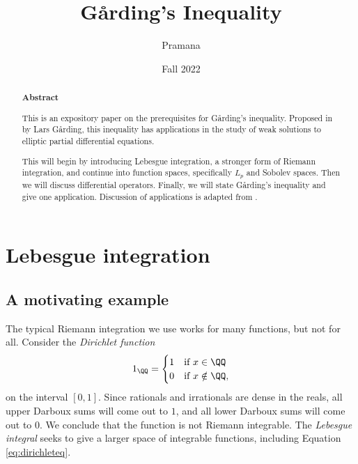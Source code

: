 \documentclass{scrartcl}
\title{G\r{a}rding's Inequality}
\author{Pramana}
\date{Fall 2022}
\begin{document}

\maketitle

\begin{abstract}
    \begin{center}
        \textbf{Abstract}
    \end{center}
    This is an expository paper on the prerequisites for 
    G\r{a}rding's inequality. Proposed in \cite{original-garding} by Lars G\r{a}rding, this inequality has applications in the study of weak solutions to elliptic partial differential equations. 
    
    This will begin by introducing Lebesgue integration, a stronger form 
    of Riemann integration, and continue into function spaces, specifically $L_p$ and Sobolev spaces. Then we will discuss differential operators. Finally, we will state G\r{a}rding's inequality and give one application. 
    Discussion of applications is adapted from 
    \cite{renardy2004introduction}.
\end{abstract}
\tableofcontents
\restoregeometry

\section{Lebesgue integration}

\subsection{A motivating example}

The typical Riemann integration we use works for many functions, but
not for all. Consider the \textit{Dirichlet function} 
\begin{equation}
    \label{eq:dirichleteq}
    1_\QQ = \begin{cases}
        1 &\text{if } x\in \QQ \\
        0 &\text{if } x\notin \QQ,
    \end{cases}
\end{equation}
on the interval $[0,1]$.
Since rationals and irrationals are dense in 
the reals, all upper Darboux sums will come out to $1$, and 
all lower Darboux sums will come out to $0$. We conclude that 
the function is not Riemann integrable. The \textit{Lebesgue integral} 
seeks to give a larger space of integrable functions, 
including Equation \ref{eq:dirichleteq}.
\end{document}
